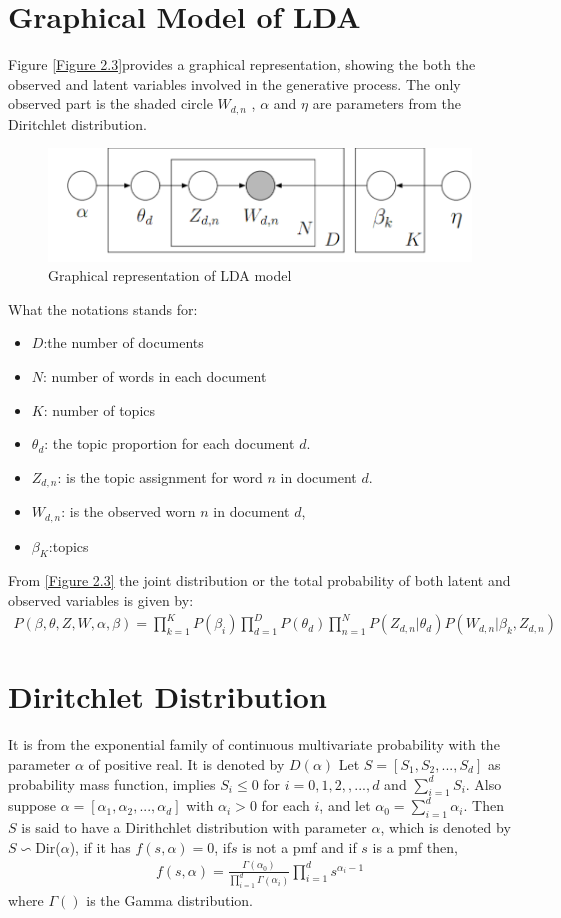 \section{Graphical Model of LDA}
Figure \eqref{Figure 2.3}provides a graphical representation, showing the both the observed and latent variables involved in the generative process.
The only observed part is the shaded circle $W_{d,n}$ , $\alpha$ and $\eta$ are parameters from the Diritchlet distribution.
\begin{figure}[hbtp]
\centering
\includegraphics[scale=0.5]{Graphical.png}
\caption{Graphical representation of LDA model} \label{Figure 2.3}
\end{figure}
What the notations stands for:
\begin{itemize}
\item$D$:the number of documents
\item$N$: number of words in each document
\item$K$: number of topics
\item$\theta_d$: the topic proportion for each document $d$.
\item $Z_{d,n}$: is the topic assignment for word $n$ in document $d$.
\item $W_{d,n}$: is the observed worn $n$ in document $d$,
\item $\beta_K$:topics
\end{itemize}
From \eqref{Figure 2.3} the joint  distribution or the total probability of both latent and observed variables is given by:
\begin{align}
P(\beta,\theta,Z,W, \alpha, \beta )=\prod_{k=1}^{K}P(\beta_i)\prod_{d=1}^{D}P(\theta_d)
\prod_{n=1}^{N}P(Z_{d,n}|\theta_d)P(W_{d,n}|\beta_k,Z_{d,n})
\end{align}
\section{Diritchlet Distribution}
It is from the exponential family of continuous multivariate probability with the parameter $\alpha$ of positive real. It is denoted by $D(\alpha)$
Let $S=[S_1,S_2,...,S_d] $ as probability mass function, implies $S_i\leqslant 0$ for $i=0,1,2,,...,d$ and $\sum _{i=1}^{d}S_i$. Also suppose $\alpha=[\alpha_1,\alpha_2,...,\alpha_d]$ with $\alpha_i>0$ for each $i$, and let $\alpha_0=\sum _{i=1}^{d}\alpha_i$. Then $S$ is said to have a Dirithchlet distribution
with parameter $\alpha$, which is denoted by $S \backsim $Dir($\alpha$), if it has $f(s,\alpha)=0$, if$s$ is not a pmf and if $s$ is a pmf then,
\begin{align}
f(s,\alpha)=\frac{\Gamma(\alpha_0)}{\prod_{i=1}^{d}\Gamma(\alpha_i)}\prod_{i=1}^{d}s^{\alpha_i -1}
\end{align}
where $\Gamma()$ is the Gamma distribution.
